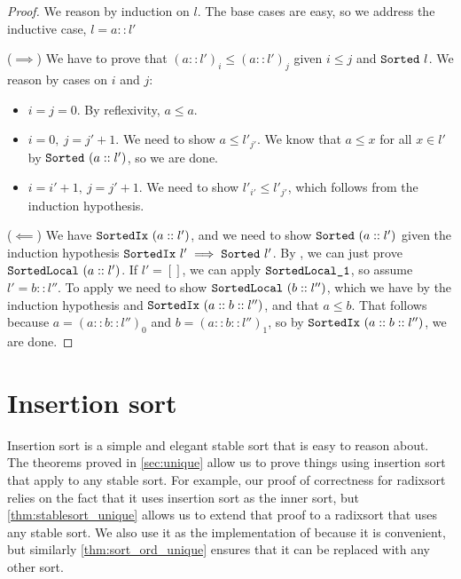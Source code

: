 \documentclass[sigplan,10pt,anonymous,review]{thesis}
\begin{document}
\sortedixiff*
\begin{proof}
  We reason by induction on $l$. The base cases are easy, so we
  address the inductive case, $l = a :: l'$

  ($\implies$) We have to prove that $(a :: l')_i \le (a :: l')_j$ given
  $i \le j$ and $\texttt{\textup{Sorted}}~l$. We reason by cases on $i$ and $j$:
  \begin{itemize}
  \item $i = j = 0$. By reflexivity, $a \le a$.
  \item $i = 0,~j=j' + 1$. We need to show $a \le l'_{j'}$. We know that
    $a \le x$ for all $x \in l'$ by $\texttt{\textup{Sorted}}~(a::l')$, so we are
    done.
  \item $i = i' +1,~j = j' + 1$. We need to show $l'_{i'} \le l'_{j'}$,
    which follows from the induction hypothesis.
  \end{itemize}

  ($\impliedby$) We have $\texttt{\textup{SortedIx}}\ \allowbreak(a :: l')$, and
  we need to show $\texttt{\textup{Sorted}}\ \allowbreak(a :: l')$ given the
  induction hypothesis $\texttt{\textup{SortedIx}}~l' \implies \texttt{\textup{Sorted}}~l'$.
  By , we can just prove
  $\texttt{\textup{SortedLocal}}\ \allowbreak(a :: l')$. If $l' = []$, we can
  apply $\texttt{\textup{SortedLocal\_1}}$, so assume $l' = b :: l''$. To apply
   we need to show
  $\var{SortedLocal}\ \allowbreak(b :: l'')$, which we have by the
  induction hypothesis and $\texttt{\textup{SortedIx}}\ \allowbreak(a :: b ::
  l'')$, and that $a \le b$. That follows because $a = (a :: b ::
  l'')_0$ and $b = (a :: b :: l'')_1$, so by
  $\texttt{\textup{SortedIx}}\ \allowbreak(a :: b :: l'')$, we are done.
\end{proof}


\section{Insertion sort}
\label{appendix:insertion_sort}

Insertion sort is a simple and elegant stable sort that is easy to
reason about. The theorems proved in \cref{sec:unique} allow us to
prove things using insertion sort that apply to any stable sort. For
example, our proof of correctness for radixsort relies on the fact
that it uses insertion sort as the inner sort, but
\cref{thm:stablesort_unique} allows us to extend that proof to a
radixsort that uses any stable sort. We also use it as the
implementation of  because it is convenient, but
similarly \cref{thm:sort_ord_unique} ensures that it can be replaced with
any other sort.
\end{document}
